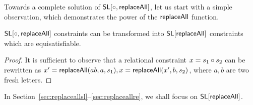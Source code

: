 Towards a complete solution of $\mathsf{SL}[\circ, \mathsf{replaceAll}]$, let us start with a simple observation, which demonstrates the power of the $\mathsf{replaceAll}$ function.

%
\begin{proposition}\label{rem-concat}
$\mathsf{SL}[\circ, \mathsf{replaceAll}]$ constraints can be transformed into $\mathsf{SL}[\mathsf{replaceAll}]$ constraints which are equisatisfiable. 
\end{proposition}
\begin{proof}
	It is sufficient to observe that %
	a relational constraint $x = s_1 \circ s_2$ can be rewritten as $x' = \mathsf{replaceAll}(ab, a, s_1), x = \mathsf{replaceAll}(x', b, s_2)$, where $a,b$ are two fresh letters.
\end{proof}

In Section~\ref{sec:replaceallsl}--\ref{sec:replaceallre}, we shall focus on $\mathsf{SL}[\mathsf{replaceAll}]$.  

 

